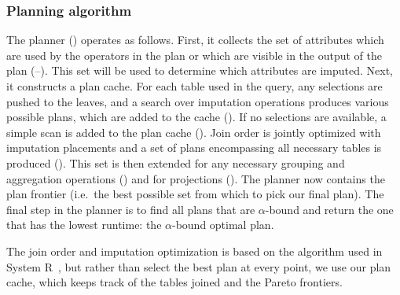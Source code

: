 \subsubsection{Planning algorithm}
The planner () operates as follows.
First, it collects the set of attributes which are used by the operators in the plan or which are visible in the output of the plan (--).
This set will be used to determine which attributes are imputed.
Next, it constructs a plan cache. For each table used in the query, any selections are pushed to the leaves, and a search over imputation operations produces various possible plans, which are added to the cache ().
If no selections are available, a 
simple scan is added to the plan cache (). Join order is jointly optimized with imputation placements and a set of
plans encompassing all necessary tables is produced (). This set is then extended for any necessary grouping and aggregation
operations () and for projections (). The planner now contains the plan frontier (i.e.\ the
best possible set from which to pick our final plan). The final step in the planner is to find all plans that are
$\alpha$-bound and return the one that has the lowest runtime: the $\alpha$-bound optimal plan.

The join order and imputation optimization is based on the algorithm used in System R~\cite{blasgen1981system},
but rather than select the best plan at every point, we use our plan cache, which keeps track of the tables joined and the Pareto frontiers.

\begin{algorithm}

\end{algorithm}

%


